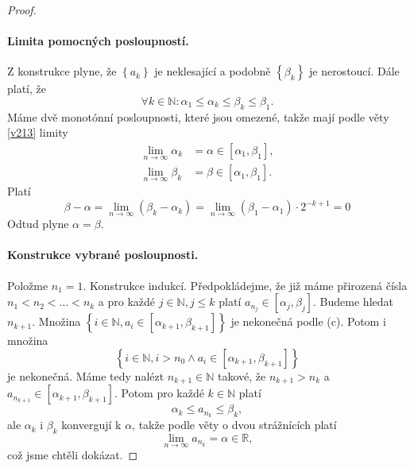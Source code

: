 \begin{proof}
	\paragraph{Limita pomocných posloupností.} Z konstrukce plyne, že $\left \{ a_k \right \} $ je neklesající a podobně
	$\left \{ \beta_k \right \} $ je nerostoucí. Dále platí, že
	$$
	    \forall k \in \mathbb N: \alpha_1 \leq \alpha_k \leq \beta_k \leq \beta_1.
	$$
	Máme dvě monotónní posloupnosti, které jsou omezené, takže mají podle věty \ref{v213} limity
	\begin{align*}
		\lim_{n \to \infty} \alpha_k &= \alpha \in \left [ \alpha_1, \beta_1 \right ],  \\
		\lim_{n \to \infty} \beta_k &= \beta \in \left [ \alpha_1, \beta_1 \right ].
	\end{align*}
	Platí
	$$
        \beta - \alpha=\lim_{n \to \infty} \left( \beta_k - \alpha_k \right ) = \lim_{n \to \infty} \left( \beta_1 - \alpha_1 \right ) \cdot 2^{-k+1} = 0
	$$
	Odtud plyne $\alpha = \beta$.
	\paragraph{Konstrukce vybrané posloupnosti.} Položme $n_1=1$. Konstrukce indukcí. Předpokládejme, že
	již máme přirozená čísla $n_1 < n_2 < \dots < n_k$ a pro každé $j\in \mathbb N ,j\leq k$
	platí $a_{n_j} \in \left [ \alpha_j,\beta_j \right ] $. Budeme hledat $n_{k+1}$. Množina
	$\left \{ i\in \mathbb N , a_i \in \left [ \alpha_{k+1}, \beta_{k+1} \right ]  \right \} $
	je nekonečná podle (c). Potom i množina
	$$\left \{ i \in \mathbb N , i > n_0 \land a_i \in \left [ \alpha_{k+1}, \beta_{k+1} \right ]  \right \} $$
	je nekonečná. Máme tedy nalézt $n_{k+1} \in \mathbb N $ takové, že $n_{k+1} > n_k$ a
	$a_{n_{k+1}}\in \left [ \alpha_{k+1}, \beta_{k+1}\right ] $. Potom pro každé $k \in \mathbb N $ platí
	$$
	    \alpha_k \leq a_{n_k} \leq \beta_k,
	$$
	ale $\alpha_k$ i $\beta_k$ konvergují k $\alpha$, takže podle věty o dvou strážnících platí
	$$
        \lim_{n \to \infty} a_{n_k} = \alpha\in \mathbb R,
	$$
	což jsme chtěli dokázat.
\end{proof}

